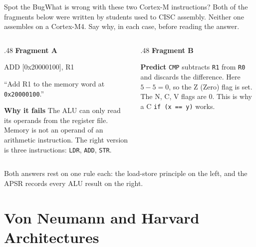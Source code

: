 \documentclass[9pt,aspectratio=169,xcolor=table]{beamer}
\begin{document}
{\beamerextras
\begin{frame}[fragile]{Spot the Bug}{What is wrong with these two Cortex-M instructions?}
    \leavevmode
    Both of the fragments below were written by students used to CISC assembly. Neither one assembles on a Cortex-M4. Say why, in each case, before reading the answer.

    \vspace{3mm}
    \begin{columns}[T]
    \begin{column}{.48\textwidth}
        \textbf{Fragment A}
\begin{asm}[basicstyle=\ttfamily\footnotesize]
ADD   [0x20000100], R1
\end{asm}
        {\footnotesize ``Add R1 to the memory word at \texttt{0x20000100}.''}

        \vspace{2mm}
        \textbf{Why it fails}
        {\footnotesize The ALU can only read its operands from the register file. Memory is \alert{not} an operand of an arithmetic instruction. The right version is three instructions: \texttt{LDR}, \texttt{ADD}, \texttt{STR}.}
    \end{column}
    \begin{column}{.48\textwidth}
        \textbf{Fragment B}

        \textbf{Predict}
        {\footnotesize \texttt{CMP} subtracts \texttt{R1} from \texttt{R0} and discards the difference. Here $5 - 5 = 0$, so the \alert{Z (Zero) flag} is set. The N, C, V flags are 0. This is why a C \texttt{if (x == y)} works.}
    \end{column}
    \end{columns}

    \vspace{2mm}
    {\small\centering Both answers rest on one rule each: the \alert{load-store principle} on the left, and the \alert{APSR records every ALU result} on the right.\par}
\end{frame}
}


\section{Von Neumann and Harvard Architectures}
\end{document}
